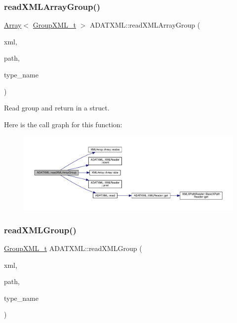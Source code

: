 \subsubsection{\texorpdfstring{readXMLArrayGroup()}{readXMLArrayGroup()}}
{\footnotesize\ttfamily \mbox{\hyperlink{classXMLArray_1_1Array}{Array}}$<$ \mbox{\hyperlink{structADATXML_1_1GroupXML__t}{Group\+X\+M\+L\+\_\+t}} $>$ A\+D\+A\+T\+X\+M\+L\+::read\+X\+M\+L\+Array\+Group (\begin{DoxyParamCaption}\item[{\mbox{\hyperlink{classADATXML_1_1XMLReader}{X\+M\+L\+Reader}} \&}]{xml,  }\item[{const std\+::string \&}]{path,  }\item[{const std\+::string \&}]{type\+\_\+name }\end{DoxyParamCaption})}



Read group and return in a struct. 

Here is the call graph for this function\+:\nopagebreak
\begin{figure}[H]
\begin{center}
\leavevmode
\includegraphics[width=350pt]{d2/da3/group__io_gadf35620dfa0c46f11572a9ffb3452847_cgraph}
\end{center}
\end{figure}
\mbox{\label{group__io_ga55d25898ac653a77ea446bee3682d29b}} 
\subsubsection{\texorpdfstring{readXMLGroup()}{readXMLGroup()}}
{\footnotesize\ttfamily \mbox{\hyperlink{structADATXML_1_1GroupXML__t}{Group\+X\+M\+L\+\_\+t}} A\+D\+A\+T\+X\+M\+L\+::read\+X\+M\+L\+Group (\begin{DoxyParamCaption}\item[{\mbox{\hyperlink{classADATXML_1_1XMLReader}{X\+M\+L\+Reader}} \&}]{xml,  }\item[{const std\+::string \&}]{path,  }\item[{const std\+::string \&}]{type\+\_\+name }\end{DoxyParamCaption})}



